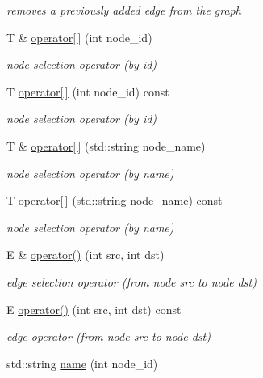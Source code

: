 \begin{DoxyCompactItemize}
\begin{DoxyCompactList}\small\item\em removes a previously added edge from the graph \end{DoxyCompactList}\item 
T \& \hyperlink{classlitegraph_1_1Graph_a2a44ddff3d0fa31a70c7fe0102e114e2}{operator\mbox{[}$\,$\mbox{]}} (int node\+\_\+id)
\begin{DoxyCompactList}\small\item\em node selection operator (by id) \end{DoxyCompactList}\item 
T \hyperlink{classlitegraph_1_1Graph_a791c3a42fa2150cbf02baed18765f72e}{operator\mbox{[}$\,$\mbox{]}} (int node\+\_\+id) const
\begin{DoxyCompactList}\small\item\em node selection operator (by id) \end{DoxyCompactList}\item 
T \& \hyperlink{classlitegraph_1_1Graph_acbeefc1b802edb8c5886fa764a5e1507}{operator\mbox{[}$\,$\mbox{]}} (std\+::string node\+\_\+name)
\begin{DoxyCompactList}\small\item\em node selection operator (by name) \end{DoxyCompactList}\item 
T \hyperlink{classlitegraph_1_1Graph_a15c0fc0dfe015a19d09d568407dad2f0}{operator\mbox{[}$\,$\mbox{]}} (std\+::string node\+\_\+name) const
\begin{DoxyCompactList}\small\item\em node selection operator (by name) \end{DoxyCompactList}\item 
E \& \hyperlink{classlitegraph_1_1Graph_aa7009938b623c493b2017c3cea97574e}{operator()} (int src, int dst)
\begin{DoxyCompactList}\small\item\em edge selection operator (from node src to node dst) \end{DoxyCompactList}\item 
E \hyperlink{classlitegraph_1_1Graph_a5761af304131b2977a756d0a5dcd5b4e}{operator()} (int src, int dst) const
\begin{DoxyCompactList}\small\item\em edge operator (from node src to node dst) \end{DoxyCompactList}\item 
std\+::string \hyperlink{classlitegraph_1_1Graph_a48e0035e3e126eb0c6f23692d6fab16d}{name} (int node\+\_\+id)

\end{DoxyCompactItemize}
